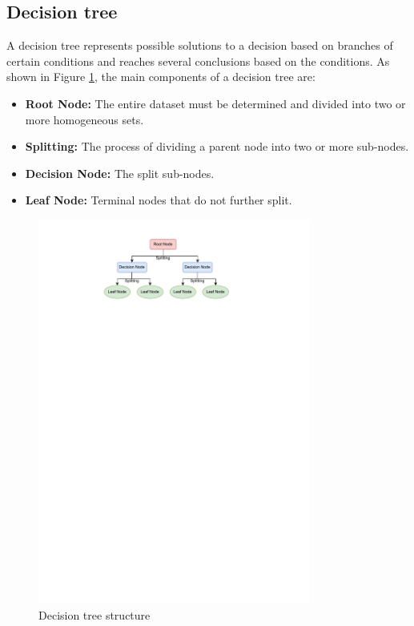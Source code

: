 \subsection{Decision tree}

A decision tree \cite{song2015decision} represents possible solutions to a decision based on branches of certain conditions and reaches several conclusions based on the conditions. As shown in Figure \ref{fig_decision_tree}, the main components of a decision tree are:

\begin{itemize}
\item \textbf{Root Node:} The entire dataset must be determined and divided into two or more homogeneous sets.
\item \textbf{Splitting:} The process of dividing a parent node into two or more sub-nodes.
\item \textbf{Decision Node:} The split sub-nodes.
\item \textbf{Leaf Node:} Terminal nodes that do not further split.
\end{itemize}

\begin{figure}[H]
    \centering
    \includegraphics[width=0.8\textwidth]{figures/decision-tree.pdf}
    \caption{Decision tree structure}
    \label{fig_decision_tree}
\end{figure}

